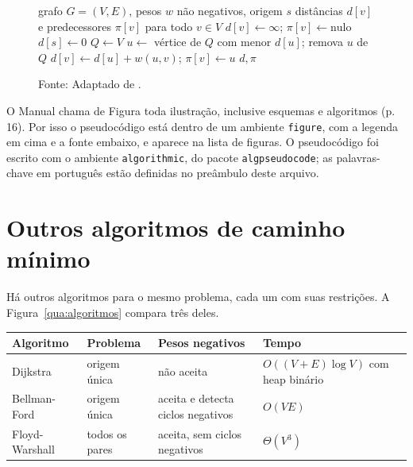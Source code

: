 \documentclass[diss,capa]{texufpel}
\begin{document}
\begin{figure}[htbp]
  \caption{Pseudocódigo do algoritmo de Dijkstra}
  \label{fig:dijkstra}
  \begin{algorithmic}[1]
    \Require grafo $G = (V, E)$, pesos $w$ não negativos, origem $s$
    \Ensure distâncias $d[v]$ e predecessores $\pi[v]$ para todo $v \in V$
      \State $d[v] \gets \infty$; \quad $\pi[v] \gets \text{nulo}$
    \EndFor
    \State $d[s] \gets 0$
    \State $Q \gets V$ 
      \State $u \gets$ vértice de $Q$ com menor $d[u]$; remova $u$ de $Q$
          \State $d[v] \gets d[u] + w(u, v)$; \quad $\pi[v] \gets u$
        \EndIf
      \EndFor
    \EndWhile
    \State \Return $d, \pi$
  \end{algorithmic}
  \caption*{Fonte: Adaptado de \citet{Cormen:2022:IA}.}
\end{figure}

O Manual chama de Figura toda ilustração, inclusive esquemas e algoritmos
(p. 16). Por isso o pseudocódigo está dentro de um ambiente \texttt{figure},
com a legenda em cima e a fonte embaixo, e aparece na lista de figuras. O
pseudocódigo foi escrito com o ambiente \texttt{algorithmic}, do pacote
\texttt{algpseudocode}; as palavras-chave em português estão definidas no
preâmbulo deste arquivo.

\section{Outros algoritmos de caminho mínimo}
\label{sec:outros}

Há outros algoritmos para o mesmo problema, cada um com suas restrições. A
Figura~\ref{qua:algoritmos} compara três deles.

\begin{quadro}[htbp]
  \caption{Comparação entre algoritmos de caminho mínimo}
  \label{qua:algoritmos}
  \centering
  \begin{tabular}{|p{2.8cm}|p{2.6cm}|p{4.4cm}|p{4.2cm}|}
    \hline
    \textbf{Algoritmo} & \textbf{Problema} & \textbf{Pesos negativos} & \textbf{Tempo} \\ \hline
    Dijkstra       & origem única       & não aceita & $O((V + E) \log V)$ com heap binário \\ \hline
    Bellman-Ford   & origem única       & aceita e detecta ciclos negativos & $O(VE)$ \\ \hline
    Floyd-Warshall & todos os pares     & aceita, sem ciclos negativos & $\Theta(V^3)$ \\ \hline
  \end{tabular}
  \caption*{Fonte: Elaborado pela autora (2026), com base em \citet{Cormen:2022:IA}.}
\end{quadro}
\end{document}
